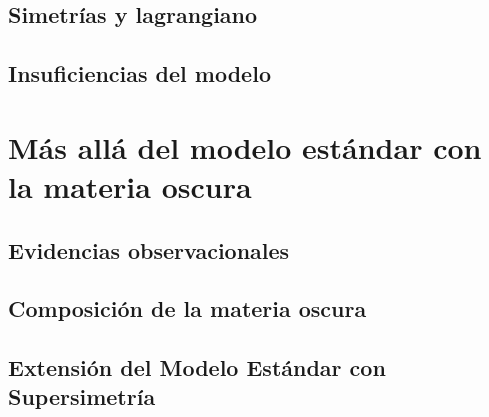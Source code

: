 \documentclass[12pt]{report}
\begin{document}
		\subsection{Simetrías y lagrangiano} 
		
	
		\subsection{Insuficiencias del modelo}
		
	
	
	\section{M\'as all\'a del modelo est\'andar con la materia oscura}
	
	
		\subsection{Evidencias observacionales}
		
		
		
		\subsection{Composición de la materia oscura}
		
		
		
		
		\subsection{Extensión del Modelo Estándar con Supersimetría}
		
\end{document}

